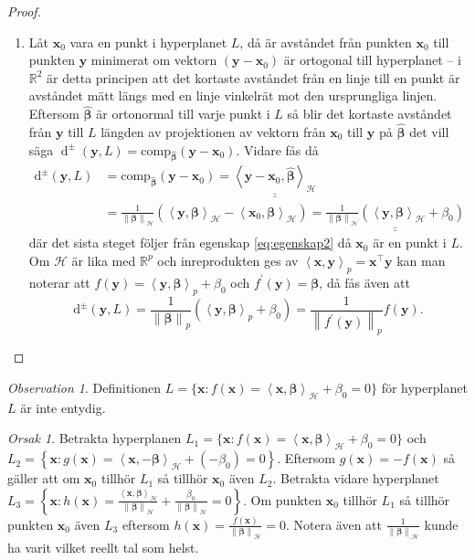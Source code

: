 \documentclass[a4paper, 12pt]{report}
\theoremstyle{definition}
\theoremstyle{remark}
\newtheorem*{rem}{Observation}
\newtheorem*{reas}{Orsak}
\newcommand{\bfbeta}{{\boldsymbol{\beta}}}
\newcommand{\bfx}{\mathbf{x}}
\newcommand{\bfy}{\mathbf{y}}
\newcommand{\llangle}{\left\langle}
\newcommand{\rrangle}{\right\rangle}
\newcommand{\sephyp}{\{ \mathbf{x} : f\left(\mathbf{x}\right)=\inner{\bfx}{\bfbeta}_\mathcal{H} + \beta_0=0\}}
\newcommand{\inner}[2]{\llangle #1, #2 \rrangle}
\newcommand{\hil}{\mathcal{H}}
\begin{document}
\begin{proof}
\begin{enumerate}
	\item Låt $\mathbf{x}_0$ vara en punkt i hyperplanet $L$, då är avståndet från punkten $\bfx_0$ till punkten $\bfy$ minimerat om vektorn $\left(\bfy-\bfx_0\right)$ är ortogonal till hyperplanet -- i $\mathbb{R}^2$ är detta principen att det kortaste avståndet från en linje till en punkt är avståndet mätt längs med en linje vinkelrät mot den ursprungliga linjen.
	Eftersom $\widehat{\bfbeta}$ är ortonormal till varje punkt i $L$ så blir det kortaste avståndet från $\bfy$ till $L$ längden av projektionen av vektorn från $\bfx_0$ till $\bfy$ på $\widehat{\bfbeta}$ det vill säga $\operatorname{d}^\pm \left(\mathbf{y}, L\right)=\operatorname{comp_{\widehat{\bfbeta}}} \left( \bfy - \mathbf{x}_0 \right)$.
	Vidare fås då
	\begin{align*}
		\operatorname{d^\pm} \left( \bfy, L \right) &= \operatorname{comp_{\widehat{\bfbeta}}} \left( \bfy - \mathbf{x}_0 \right)
		=\underline{\underline{ \inner{\bfy - \mathbf{x}_0}{\widehat{\bfbeta}}_\hil}}\\
		&= \frac{1}{\left\|\bfbeta
\right\|_\hil}\left(\inner{\bfy}{\bfbeta}_\hil - \inner{\bfx_0}{\bfbeta}_\hil\right)=\underline{\underline{\frac{1}{\left\|\bfbeta
\right\|_\hil}\left(\inner{\bfy}{\bfbeta}_\hil + \beta_0\right)}}
	\end{align*}
	där det sista steget följer från egenskap \ref{eq:egenskap2} då $\mathbf{x}_0$ är en punkt i $L$.
	Om $\hil$ är lika med $\mathbb{R}^p$ och inreprodukten ges av $\inner{\bfx}{\bfy}_p=\bfx^\intercal\bfy$ kan man noterar att $f\left(\bfy\right)=\inner{\bfy}{\bfbeta}_p+\beta_0$ och $f^\prime\left(\bfy\right)=\bfbeta$, då fås även att
	\begin{equation*}
		\operatorname{d^\pm} \left( \bfy, L \right)=\frac{1}{\left\|\bfbeta
\right\|_p}\left(\inner{\bfy}{\bfbeta}_p + \beta_0\right)=\frac{1}{\left\|f^\prime\left(\bfy\right)
\right\|_p}f\left(\bfy\right).
	\end{equation*}
	\qedhere
\end{enumerate}
\end{proof}

\begin{rem}
	Definitionen $L=\{ \mathbf{x} : f\left(\mathbf{x}\right)=\inner{\bfx}{\bfbeta}_\hil + \beta_0=0\}$ för hyperplanet $L$ är inte entydig.
\end{rem}
\begin{reas}
	Betrakta hyperplanen $L_1 = \sephyp$ och $L_2 = \left\{\mathbf{x}: g\left(\mathbf{x}\right)=\inner{\bfx}{-\bfbeta}_\hil + \left(-\beta_0\right) = 0\right\}$. Eftersom $g\left(\mathbf{x}\right) = -f\left(\mathbf{x}\right)$ så gäller att om $\mathbf{x}_0$ tillhör $L_1$ så tillhör $\mathbf{x}_0$ även $L_2$.
	Betrakta vidare hyperplanet $L_3= \left\{\mathbf{x}: h\left(\mathbf{x}\right)=\frac{\inner{\bfx}{\bfbeta}_\hil}{\left\|\bfbeta
\right\|_\hil} + \frac{\beta_0}{\left\|\bfbeta
\right\|_\hil}=0\right\}$. Om punkten $\mathbf{x}_0$ tillhör $L_1$ så tillhör punkten $\mathbf{x}_0$ även $L_3$ eftersom $h\left(\mathbf{x}\right) = \frac{f\left(\mathbf{x}\right)}{\left\|\bfbeta
\right\|_\hil}=0$. Notera även att $\frac{1}{\left\|\bfbeta
\right\|_\hil}$ kunde ha varit vilket reellt tal som helst.
\end{reas}
\end{document}
